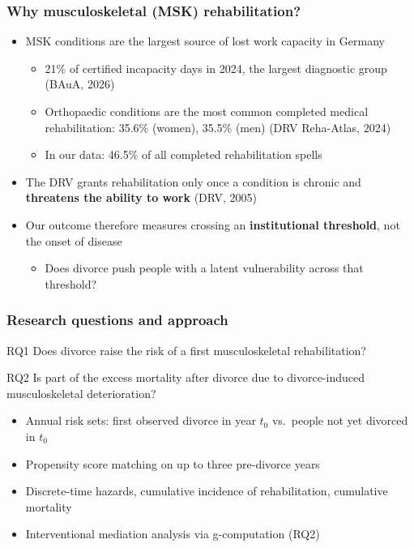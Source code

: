 \documentclass[t,20pt]{beamer}
\newcommand{\hl}[1]{\textcolor{BiBViolett}{\textbf{#1}}}           %
\newcommand{\ct}[1]{{\color{BiBBlau80}(#1)}}                        %
\begin{document}
\begin{bibframe}
  \frametitle{Why musculoskeletal (MSK) rehabilitation?}
  \begin{itemize}
    \item MSK conditions are the largest source of lost work capacity in Germany
    \begin{itemize}
      \item 21\% of certified incapacity days in 2024, the largest diagnostic group \ct{BAuA, 2026}
      \item Orthopaedic conditions are the most common completed medical rehabilitation: 35.6\% (women), 35.5\% (men) \ct{DRV Reha-Atlas, 2024}
      \item In our data: 46.5\% of all completed rehabilitation spells
    \end{itemize}
    \item The DRV grants rehabilitation only once a condition is chronic and \hl{threatens the ability to work} \ct{DRV, 2005}
    \item Our outcome therefore measures crossing an \hl{institutional threshold}, not the onset of disease
    \begin{itemize}
      \item Does divorce push people with a latent vulnerability across that threshold?
    \end{itemize}
  \end{itemize}
\end{bibframe}

\begin{bibframe}
  \frametitle{Research questions and approach}
  \begin{block}{RQ1}
    Does divorce raise the risk of a first musculoskeletal rehabilitation?
  \end{block}
  \begin{block}{RQ2}
    Is part of the excess mortality after divorce due to divorce-induced musculoskeletal deterioration?
  \end{block}
  \vspace{0.3cm}
  \begin{itemize}
    \item Annual risk sets: first observed divorce in year $t_0$ vs.\ people not yet divorced in $t_0$
    \item Propensity score matching on up to three pre-divorce years
    \item Discrete-time hazards, cumulative incidence of rehabilitation, cumulative mortality
    \item Interventional mediation analysis via g-computation (RQ2)
  \end{itemize}
\end{bibframe}
\end{document}
